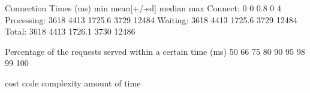 Connection Times (ms)
              min  mean[+/-sd] median   max
Connect:        0    0   0.8      0       4
Processing:  3618 4413 1725.6   3729   12484
Waiting:     3618 4413 1725.6   3729   12484
Total:       3618 4413 1726.1   3730   12486

Percentage of the requests served within a certain time (ms)
  50%
  66%
  75%
  80%
  90%
  95%
  98%
  99%
 100%


cost
code complexity
amount of time
